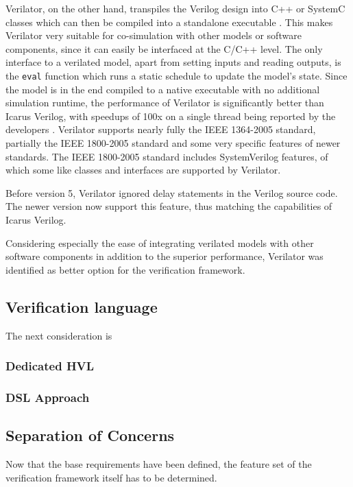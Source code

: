 \documentclass[12pt]{book}
\begin{document}
Verilator, on the other hand, transpiles the Verilog design into C++ or SystemC classes which can then be compiled into a standalone executable \cite{verilator}. This makes Verilator very suitable for co-simulation with other models or software components, since it can easily be interfaced at the C/C++ level. The only interface to a verilated model, apart from setting inputs and reading outputs, is the \texttt{eval} function which runs a static schedule to update the model's state. Since the model is in the end compiled to a native executable with no additional simulation runtime, the performance of Verilator is significantly better than Icarus Verilog, with speedups of 100x on a single thread being reported by the developers \cite{verilator}. Verilator supports nearly fully the IEEE 1364-2005 standard, partially the IEEE 1800-2005 standard and some very specific features of newer standards. The IEEE 1800-2005 standard includes SystemVerilog features, of which some like classes and interfaces are supported by Verilator.

Before version 5, Verilator ignored delay statements in the Verilog source code. The newer version now support this feature, thus matching the capabilities of Icarus Verilog. 

Considering especially the ease of integrating verilated models with other software components in addition to the superior performance, Verilator was identified as better option for the verification framework.


\subsection{Verification language}
The next consideration is 

\subsubsection{Dedicated HVL}

\subsubsection{DSL Approach}

\subsection{Separation of Concerns} %
Now that the base requirements have been defined, the feature set of the verification framework itself has to be determined. 
\end{document}
